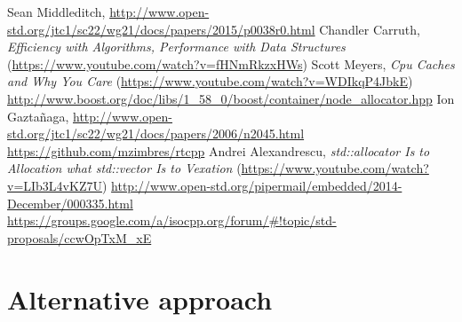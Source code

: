 \documentclass[11pt]{article}
\begin{document}
\begin{thebibliography}{9}

   Sean Middleditch, \url{http://www.open-std.org/jtc1/sc22/wg21/docs/papers/2015/p0038r0.html}
   Chandler Carruth, {\it Efficiency with Algorithms, Performance
  with Data Structures} (\url{https://www.youtube.com/watch?v=fHNmRkzxHWs})
   Scott Meyers, {\it Cpu Caches and Why You Care} (\url{https://www.youtube.com/watch?v=WDIkqP4JbkE})
   \url{http://www.boost.org/doc/libs/1_58_0/boost/container/node_allocator.hpp}
   Ion Gazta\~ naga, \url{http://www.open-std.org/jtc1/sc22/wg21/docs/papers/2006/n2045.html}
   \url{https://github.com/mzimbres/rtcpp}
   Andrei Alexandrescu, {\it std::allocator Is to Allocation what
  std::vector Is to Vexation} (\url{https://www.youtube.com/watch?v=LIb3L4vKZ7U})
   \url{http://www.open-std.org/pipermail/embedded/2014-December/000335.html}
   \url{https://groups.google.com/a/isocpp.org/forum/#!topic/std-proposals/ccwOpTxM_xE}

\end{thebibliography}

\appendix

\section{Alternative approach} \label{alternative}
\end{document}
